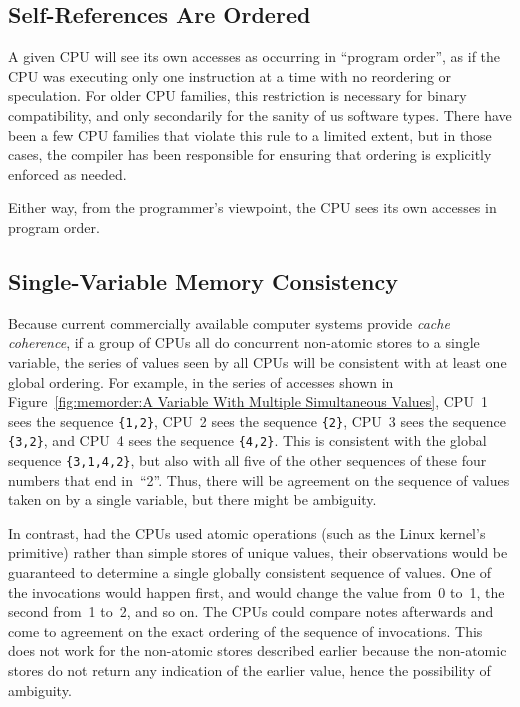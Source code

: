 \subsection{Self-References Are Ordered}

A given CPU will see its own accesses as occurring in ``program order'',
as if the CPU was executing only one instruction at a time with no
reordering or speculation.
For older CPU families, this restriction is necessary for binary compatibility,
and only secondarily for the sanity of us software types.
There have been a few CPU families that violate this rule to a limited extent,
but in those cases, the compiler has been responsible
for ensuring that ordering is explicitly enforced as needed.

Either way, from the programmer's viewpoint, the CPU sees its own accesses
in program order.

\subsection{Single-Variable Memory Consistency}
\label{sec:memorder:Single-Variable Memory Consistency}

Because current commercially available computer systems provide
\emph{cache coherence},
if a group of CPUs all do concurrent non-atomic stores to a single variable,
the series of values seen by all CPUs will be consistent with at
least one global ordering.
For example, in the series of accesses shown in
Figure~\ref{fig:memorder:A Variable With Multiple Simultaneous Values},
CPU~1 sees the sequence {\tt \{1,2\}},
CPU~2 sees the sequence {\tt \{2\}},
CPU~3 sees the sequence {\tt \{3,2\}},
and
CPU~4 sees the sequence {\tt \{4,2\}}.
This is consistent with the global sequence {\tt \{3,1,4,2\}},
but also with all five of the other sequences of these four numbers that end
in~``2''.
Thus, there will be agreement on the sequence of values taken on
by a single variable, but there might be ambiguity.

In contrast, had the CPUs used atomic operations (such as the Linux kernel's
 primitive) rather than simple stores of
unique values, their observations would
be guaranteed to determine a single globally consistent sequence of values.
One of the  invocations would happen first,
and would change the value from~0 to~1, the second from~1 to~2, and
so on.
The CPUs could compare notes afterwards and come to agreement on the
exact ordering of the sequence of  invocations.
This does not work for the non-atomic stores described earlier because
the non-atomic stores do not return any indication of the earlier value,
hence the possibility of ambiguity.

